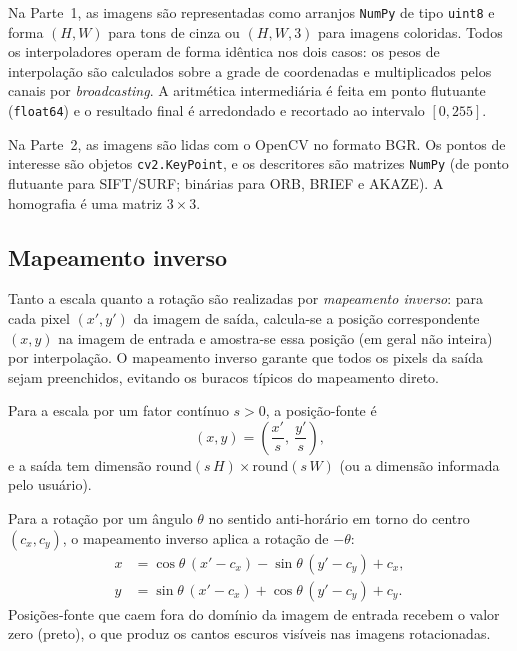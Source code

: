 \documentclass[12pt,a4paper]{article}
\begin{document}
Na Parte~1, as imagens são representadas como arranjos \texttt{NumPy} de tipo
\texttt{uint8} e forma $(H, W)$ para tons de cinza ou $(H, W, 3)$ para imagens
coloridas. Todos os interpoladores operam de forma idêntica nos dois casos: os
pesos de interpolação são calculados sobre a grade de coordenadas e
multiplicados pelos canais por \emph{broadcasting}. A aritmética intermediária
é feita em ponto flutuante (\texttt{float64}) e o resultado final é arredondado
e recortado ao intervalo $[0, 255]$.

Na Parte~2, as imagens são lidas com o OpenCV no formato BGR. Os pontos de
interesse são objetos \texttt{cv2.KeyPoint}, e os descritores são matrizes
\texttt{NumPy} (de ponto flutuante para SIFT/SURF; binárias para ORB, BRIEF e
AKAZE). A homografia é uma matriz $3 \times 3$.

\subsection{Mapeamento inverso}
\label{sec:mapeamento}

Tanto a escala quanto a rotação são realizadas por \emph{mapeamento inverso}:
para cada pixel $(x', y')$ da imagem de saída, calcula-se a posição
correspondente $(x, y)$ na imagem de entrada e amostra-se essa posição (em
geral não inteira) por interpolação. O mapeamento inverso garante que todos os
pixels da saída sejam preenchidos, evitando os buracos típicos do mapeamento
direto.

Para a escala por um fator contínuo $s > 0$, a posição-fonte é
\begin{equation}
  (x, y) = \left( \frac{x'}{s},\ \frac{y'}{s} \right),
  \label{eq:escala}
\end{equation}
e a saída tem dimensão $\mathrm{round}(s\,H) \times \mathrm{round}(s\,W)$
(ou a dimensão informada pelo usuário).

Para a rotação por um ângulo $\theta$ no sentido anti-horário em torno do
centro $(c_x, c_y)$, o mapeamento inverso aplica a rotação de $-\theta$:
\begin{equation}
  \begin{aligned}
    x &= \cos\theta\,(x' - c_x) - \sin\theta\,(y' - c_y) + c_x, \\
    y &= \sin\theta\,(x' - c_x) + \cos\theta\,(y' - c_y) + c_y.
  \end{aligned}
  \label{eq:rotacao}
\end{equation}
Posições-fonte que caem fora do domínio da imagem de entrada recebem o valor
zero (preto), o que produz os cantos escuros visíveis nas imagens rotacionadas.
\end{document}
